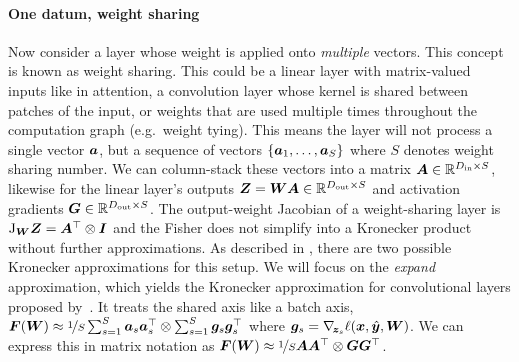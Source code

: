 \paragraph{One datum, weight sharing} Now consider a layer whose weight is applied onto \emph{multiple} vectors.
This concept is known as weight sharing.
This could be a linear layer with matrix-valued inputs like in attention, a convolution layer whose kernel is shared between patches of the input, or weights that are used multiple times throughout the computation graph (e.g.\, weight tying).
This means the layer will not process a single vector ${\bm{a}}$, but a sequence of vectors $\left\{ {\bm{a}}_1, \dots, {\bm{a}}_S \right\}$ where $S$ denotes weight sharing number.
We can column-stack these vectors into a matrix ${\bm{A}} \in {\mathbb{R}}^{D_{\text{in}}\times S}$, likewise for the linear layer's outputs ${\bm{Z}} = {\bm{W}} {\bm{A}} \in {\mathbb{R}}^{D_{\text{out}}\times S}$ and activation gradients ${\bm{G}} \in {\mathbb{R}}^{D_{\text{out}} \times S}$.
The output-weight Jacobian of a weight-sharing layer is $\mathrm{J}_{{\bm{W}}} {\bm{Z}} = {\bm{A}}^{\top} \otimes {\bm{I}}$ \cite[see e.g.][]{dangel2020modular} and the Fisher does not simplify into a Kronecker product without further approximations.
As described in \citet{eschenhagen2023kroneckerfactored}, there are two possible Kronecker approximations for this setup.
We will focus on the \emph{expand} approximation, which yields the Kronecker approximation for convolutional layers proposed by~\citet{grosse2016kroneckerfactored}.
It treats the shared axis like a batch axis,
${\bm{F}}({\bm{W}}) \approx \nicefrac{1}{S} \sum_{s=1}^S {\bm{a}}_s {\bm{a}}_s^{\top} \otimes \sum_{s=1}^S {\bm{g}}_s {\bm{g}}_s^{\top}$ where ${\bm{g}}_s = \nabla_{\!{{\bm{z}}_s}} \ell({\bm{x}}, \hat{{\bm{y}}}, {\bm{W}})$.
We can express this in matrix notation as ${\bm{F}}({\bm{W}}) \approx \nicefrac{1}{S} {\bm{A}} {\bm{A}}^{\top} \otimes {\bm{G}} {\bm{G}}^{\top}$.


